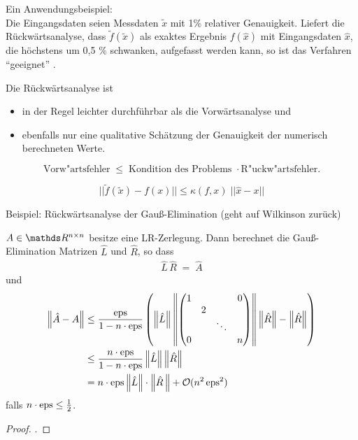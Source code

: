Ein Anwendungsbeispiel:\\
Die Eingangsdaten seien Messdaten $\tilde{x}$  mit 1\% relativer Genauigkeit. 
Liefert die Rückwärtsanalyse, dass $\tilde{f} (\tilde{x})$ als exaktes Ergebnis 
$f(\hat x)$ mit Eingangsdaten $\hat x$, 
die höchstens um 0,5 \% schwanken, aufgefasst werden kann,
so ist das Verfahren \enquote{geeignet} . 

Die Rückwärtsanalyse ist
\begin{itemize}
\item in der Regel leichter durchführbar als die
  Vorwärtsanalyse  und 
\item ebenfalls nur eine qualitative Schätzung der
  Genauigkeit der numerisch berechneten Werte.
\end{itemize}

\begin{Beme}
  $$ \mbox{Vorw"artsfehler} \; \leq \; \mbox{Kondition des
    Problems } \cdot \mbox{R"uckw"artsfehler} .$$
  
  $$ ||\tilde f (\tilde x)  - f(x)|| \leq \kappa (f,x) \; || \hat x -x|| $$
  
  Beispiel: Rückwärtsanalyse der Gauß-Elimination
  (geht auf Wilkinson zurück)
\end{Beme}


\begin{Satze}
  $A \in \R^{n\times n}$ besitze eine LR-Zerlegung. Dann berechnet die
  Gauß-Elimination Matrizen $\hat{L}$ und $\hat{R}$,
  so dass
  \begin{gather*}\hat{L}\,\hat{R}\; = \;\hat{A}\end{gather*}
  und
  \begin{align*}
    \left\| \hat{ A}-A \right\| & \leq 
    \frac{\operatorname{eps}}{1-n \cdot \operatorname{eps}}
      \left( \left\| \hat{L} \right\|
      \left\| \begin{pmatrix}
               1 && & 0\\
               &2\\
               &&\ddots \\
                0&&& n\\
       \end{pmatrix} \right\|\left\| \hat{R} \right\|-\left\| \hat{R} \right\|
       \right)\\
      & \leq  \frac{n\cdot \operatorname{eps}}{1-n\cdot \operatorname{eps}}\left\| \hat{L} \right\|\left\| \hat{R} \right\| \\
      & = n\cdot \operatorname{eps} \left\| \hat{L} \right\|\cdot \left\| \hat{R}\, \right\| +
                                 \mathcal{O}( n^2 \operatorname{eps}^2)
  \end{align*}
  falls $n\cdot \operatorname{eps} \leq \frac{1}{2}$.
\end{Satze}
\begin{proof}
  \cite[siehe][]{stoerbulirsch}.
\end{proof}


